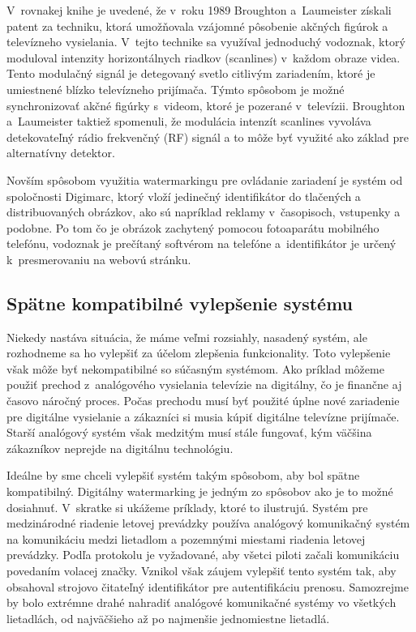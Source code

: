 V~rovnakej knihe je uvedené, že v~roku 1989 Broughton a~Laumeister získali patent za techniku, ktorá umožňovala vzájomné pôsobenie akčných figúrok a televízneho vysielania. V~tejto technike sa využíval jednoduchý vodoznak, ktorý moduloval intenzity horizontálnych riadkov (scanlines) v~každom obraze videa. Tento modulačný signál je detegovaný svetlo citlivým zariadením, ktoré je umiestnené blízko televízneho prijímača. Týmto spôsobom je možné synchronizovať akčné figúrky s~videom, ktoré je pozerané v~televízii. Broughton a~Laumeister taktiež spomenuli, že modulácia intenzít scanlines vyvoláva detekovateľný rádio frekvenčný (RF) signál a to môže byť využité ako základ pre alternatívny detektor.

Novším spôsobom využitia watermarkingu pre ovládanie zariadení je systém od spoločnosti Digimarc, ktorý vloží jedinečný identifikátor do tlačených a distribuovaných obrázkov, ako sú napríklad reklamy v~časopisoch, vstupenky a podobne. Po tom čo je obrázok zachytený pomocou fotoaparátu mobilného telefónu, vodoznak je prečítaný softvérom na telefóne a~identifikátor je určený k~presmerovaniu na webovú stránku. \cite{Cox}

\subsection{Spätne kompatibilné vylepšenie systému}
Niekedy nastáva situácia, že máme veľmi rozsiahly, nasadený systém, ale rozhodneme sa ho vylepšiť za účelom zlepšenia funkcionality. Toto vylepšenie však môže byť nekompatibilné so súčasným systémom. Ako príklad môžeme použiť prechod z~analógového vysielania televízie na digitálny, čo je finančne aj časovo náročný proces. Počas prechodu musí byť použité úplne nové zariadenie pre digitálne vysielanie a zákazníci si musia kúpiť digitálne televízne prijímače. Starší analógový systém však medzitým musí stále fungovať, kým väčšina zákazníkov neprejde na digitálnu technológiu.

Ideálne by sme chceli vylepšiť systém takým spôsobom, aby bol spätne kompatibilný. Digitálny watermarking je jedným zo spôsobov ako je to možné dosiahnuť. V~skratke si ukážeme príklady, ktoré to ilustrujú.
Systém pre medzinárodné riadenie letovej prevádzky používa analógový komunikačný systém na komunikáciu medzi lietadlom a pozemnými miestami riadenia letovej prevádzky. Podľa protokolu je vyžadované, aby všetci piloti začali komunikáciu povedaním volacej značky. Vznikol však záujem vylepšiť tento systém tak, aby obsahoval strojovo čitateľný identifikátor pre autentifikáciu prenosu. Samozrejme by bolo extrémne drahé nahradiť analógové komunikačné systémy vo všetkých lietadlách, od najväčšieho až po najmenšie jednomiestne lietadlá.

